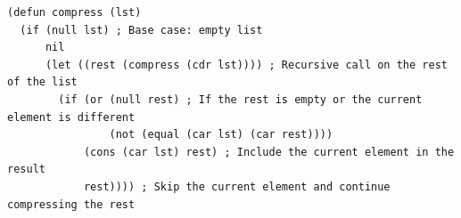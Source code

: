 \documentclass[12pt]{article}
\begin{document}
\begin{spacing}{1.5}
\begin{enumerate}
		      \begin{lstlisting}
(defun compress (lst)
  (if (null lst) ; Base case: empty list
      nil
      (let ((rest (compress (cdr lst)))) ; Recursive call on the rest of the list
        (if (or (null rest) ; If the rest is empty or the current element is different
                (not (equal (car lst) (car rest))))
            (cons (car lst) rest) ; Include the current element in the result
            rest)))) ; Skip the current element and continue compressing the rest
		      \end{lstlisting}
		      		              
	\end{enumerate}
\end{spacing}
\end{document}
